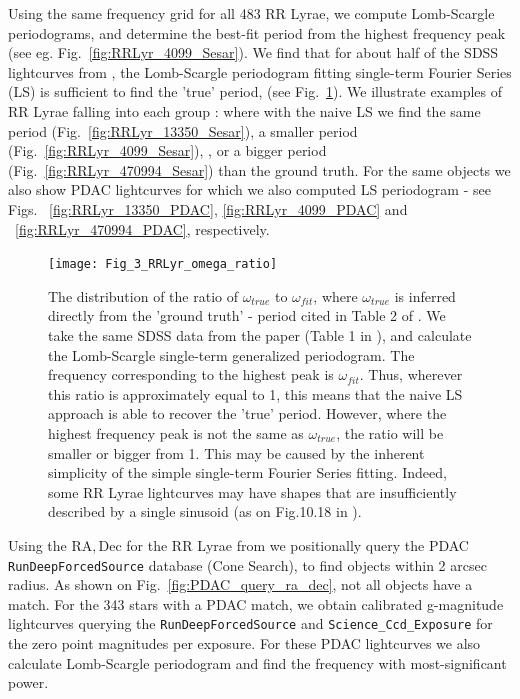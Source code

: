 \documentclass[fleqn,usenatbib]{mnras} %
\begin{document}
Using the same frequency grid for all 483 RR Lyrae, we compute Lomb-Scargle periodograms, and determine the best-fit period from the highest frequency peak (see eg. Fig.~\ref{fig:RRLyr_4099_Sesar}).  We find that for about half of the SDSS lightcurves from \cite{sesar2010}, the Lomb-Scargle periodogram fitting single-term Fourier Series (LS) is sufficient to find the 'true' period, (see Fig.~\ref{fig:RRLyr_period_ratios}). We illustrate examples of RR Lyrae falling into each group : where with the naive LS we find the same period (Fig.~\ref{fig:RRLyr_13350_Sesar}), a smaller period (Fig.~\ref{fig:RRLyr_4099_Sesar}), , or a bigger period  (Fig.~\ref{fig:RRLyr_470994_Sesar}) than the ground truth. For the same objects we also show PDAC lightcurves for which we also computed LS periodogram  -  see Figs. ~\ref{fig:RRLyr_13350_PDAC}, \ref{fig:RRLyr_4099_PDAC} and ~\ref{fig:RRLyr_470994_PDAC}, respectively. 


\begin{figure}
\texttt{[image: Fig\_3\_RRLyr\_omega\_ratio]}
\caption{The distribution of the ratio of $\omega_{true}$ to $\omega_{fit}$, where $\omega_{true}$ is inferred directly from the 'ground truth' - period cited in Table 2 of \citep{sesar2010}. We take the same SDSS data from the paper (Table 1 in \citep{sesar2010}), and calculate the Lomb-Scargle single-term generalized periodogram. The frequency corresponding to the highest peak is  $\omega_{fit}$. Thus, wherever  this ratio is approximately equal to 1, this means that the naive  LS approach is able to recover the 'true' period.  However,  where the highest  frequency peak is not the same as $\omega_{true}$, the ratio will be smaller or bigger from 1. This may be caused by the inherent simplicity of the simple single-term Fourier Series fitting. Indeed, some RR Lyrae lightcurves may have shapes that are insufficiently described by a single sinusoid (as on Fig.10.18  in \citep{ivezic2014}). }
\label{fig:RRLyr_period_ratios}
\end{figure}




Using the $\mathrm{RA}, \mathrm{Dec}$ for the RR Lyrae  from \cite{sesar2010} we positionally query the PDAC  \verb|RunDeepForcedSource| database (Cone Search), to find objects within 2 arcsec radius. As shown on Fig.~\ref{fig:PDAC_query_ra_dec}, not all objects have a match.  For the 343 stars with a PDAC match, we obtain calibrated g-magnitude lightcurves querying the \verb|RunDeepForcedSource| and \verb|Science_Ccd_Exposure| for the zero point magnitudes per exposure. For these PDAC lightcurves we also calculate Lomb-Scargle periodogram and find the frequency with most-significant power. %
\end{document}
